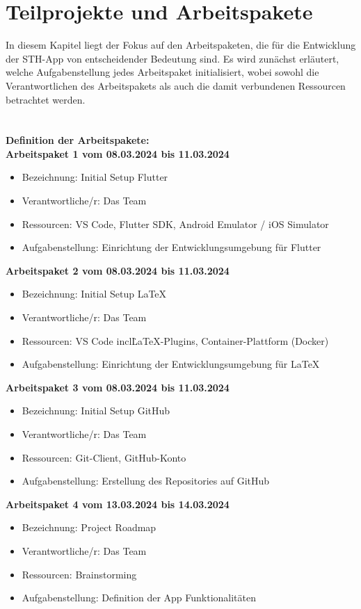 \chapter{Teilprojekte und Arbeitspakete}
In diesem Kapitel liegt der Fokus auf den Arbeitspaketen, die für die Entwicklung der STH-App von entscheidender Bedeutung sind. Es wird zunächst erläutert, welche Aufgabenstellung jedes Arbeitspaket initialisiert, wobei sowohl die Verantwortlichen des Arbeitspakets als auch die damit verbundenen Ressourcen betrachtet werden.
\\
\\
\\
\textbf{Definition der Arbeitspakete:} \\

\textbf{Arbeitspaket 1 vom 08.03.2024 bis 11.03.2024}
\begin{itemize}[itemsep=0pt]
    \item{Bezeichnung: Initial Setup Flutter} 
    \item{Verantwortliche/r: Das Team} 
    \item{Ressourcen: VS Code, Flutter SDK, Android Emulator / iOS Simulator} 
    \item{Aufgabenstellung: Einrichtung der Entwicklungsumgebung für Flutter}
\end{itemize} 

\textbf{Arbeitspaket 2 vom 08.03.2024 bis 11.03.2024}
\begin{itemize}[itemsep=0pt]
    \item{Bezeichnung: Initial Setup LaTeX} 
	\item{Verantwortliche/r: Das Team} 
	\item{Ressourcen: VS Code incl\. LaTeX-Plugins, Container-Plattform (Docker)} 
	\item{Aufgabenstellung: Einrichtung der Entwicklungsumgebung für LaTeX}
\end{itemize}

\textbf{Arbeitspaket 3 vom 08.03.2024 bis 11.03.2024}
\begin{itemize}[itemsep=0pt]
    \item{Bezeichnung: Initial Setup GitHub} 
	\item{Verantwortliche/r: Das Team} 
	\item{Ressourcen: Git-Client, GitHub-Konto} 
	\item{Aufgabenstellung: Erstellung des Repositories auf GitHub}
\end{itemize}

\textbf{Arbeitspaket 4 vom 13.03.2024 bis 14.03.2024}
\begin{itemize}[itemsep=0pt]
    \item{Bezeichnung: Project Roadmap} 
	\item{Verantwortliche/r: Das Team} 
	\item{Ressourcen: Brainstorming} 
	\item{Aufgabenstellung: Definition der App Funktionalitäten}
\end{itemize} 

